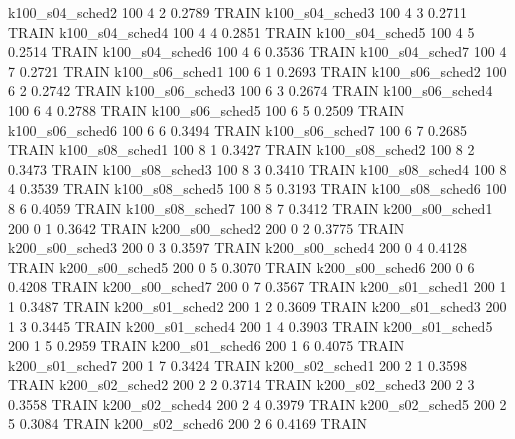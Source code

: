   k100_s04_sched2                  100    4   2    0.2789  TRAIN
  k100_s04_sched3                  100    4   3    0.2711  TRAIN
  k100_s04_sched4                  100    4   4    0.2851  TRAIN
  k100_s04_sched5                  100    4   5    0.2514  TRAIN
  k100_s04_sched6                  100    4   6    0.3536  TRAIN
  k100_s04_sched7                  100    4   7    0.2721  TRAIN
  k100_s06_sched1                  100    6   1    0.2693  TRAIN
  k100_s06_sched2                  100    6   2    0.2742  TRAIN
  k100_s06_sched3                  100    6   3    0.2674  TRAIN
  k100_s06_sched4                  100    6   4    0.2788  TRAIN
  k100_s06_sched5                  100    6   5    0.2509  TRAIN
  k100_s06_sched6                  100    6   6    0.3494  TRAIN
  k100_s06_sched7                  100    6   7    0.2685  TRAIN
  k100_s08_sched1                  100    8   1    0.3427  TRAIN
  k100_s08_sched2                  100    8   2    0.3473  TRAIN
  k100_s08_sched3                  100    8   3    0.3410  TRAIN
  k100_s08_sched4                  100    8   4    0.3539  TRAIN
  k100_s08_sched5                  100    8   5    0.3193  TRAIN
  k100_s08_sched6                  100    8   6    0.4059  TRAIN
  k100_s08_sched7                  100    8   7    0.3412  TRAIN
  k200_s00_sched1                  200    0   1    0.3642  TRAIN
  k200_s00_sched2                  200    0   2    0.3775  TRAIN
  k200_s00_sched3                  200    0   3    0.3597  TRAIN
  k200_s00_sched4                  200    0   4    0.4128  TRAIN
  k200_s00_sched5                  200    0   5    0.3070  TRAIN
  k200_s00_sched6                  200    0   6    0.4208  TRAIN
  k200_s00_sched7                  200    0   7    0.3567  TRAIN
  k200_s01_sched1                  200    1   1    0.3487  TRAIN
  k200_s01_sched2                  200    1   2    0.3609  TRAIN
  k200_s01_sched3                  200    1   3    0.3445  TRAIN
  k200_s01_sched4                  200    1   4    0.3903  TRAIN
  k200_s01_sched5                  200    1   5    0.2959  TRAIN
  k200_s01_sched6                  200    1   6    0.4075  TRAIN
  k200_s01_sched7                  200    1   7    0.3424  TRAIN
  k200_s02_sched1                  200    2   1    0.3598  TRAIN
  k200_s02_sched2                  200    2   2    0.3714  TRAIN
  k200_s02_sched3                  200    2   3    0.3558  TRAIN
  k200_s02_sched4                  200    2   4    0.3979  TRAIN
  k200_s02_sched5                  200    2   5    0.3084  TRAIN
  k200_s02_sched6                  200    2   6    0.4169  TRAIN
